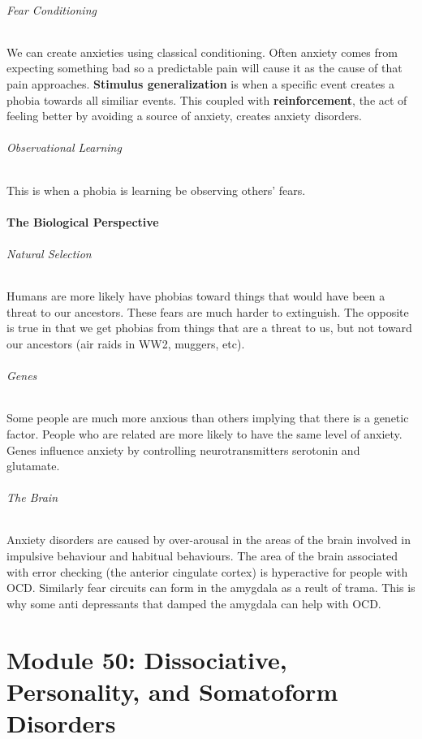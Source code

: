 \documentclass[12pt]{article}
\begin{document}
\paragraph*{Fear Conditioning}
We can create anxieties using classical conditioning. Often anxiety comes from expecting something bad so a predictable pain will cause it as the cause of that pain approaches. \textbf{Stimulus generalization} is when a specific event creates a phobia towards all similiar events. This coupled with \textbf{reinforcement}, the act of feeling better by avoiding a source of anxiety, creates anxiety disorders.
\paragraph*{Observational Learning}
This is when a phobia is learning be observing others' fears.
\subsection*{The Biological Perspective}
\paragraph*{Natural Selection}
Humans are more likely have phobias toward things that would have been a threat to our ancestors. These fears are much harder to extinguish. The opposite is true in that we get phobias from things that are a threat to us, but not toward our ancestors (air raids in WW2, muggers, etc).
\paragraph*{Genes}
Some people are much more anxious than others implying that there is a genetic factor. People who are related are more likely to have the same level of anxiety. Genes influence anxiety by controlling neurotransmitters serotonin and glutamate. 
\paragraph*{The Brain}
Anxiety disorders are caused by over-arousal in the areas of the brain involved in impulsive behaviour and habitual behaviours. The area of the brain associated with error checking (the anterior cingulate cortex) is hyperactive for people with OCD. Similarly fear circuits can form in the amygdala as a reult of trama. This is why some anti depressants that damped the amygdala can help with OCD.

\part*{Module 50: Dissociative, Personality, and Somatoform Disorders}
\end{document}
